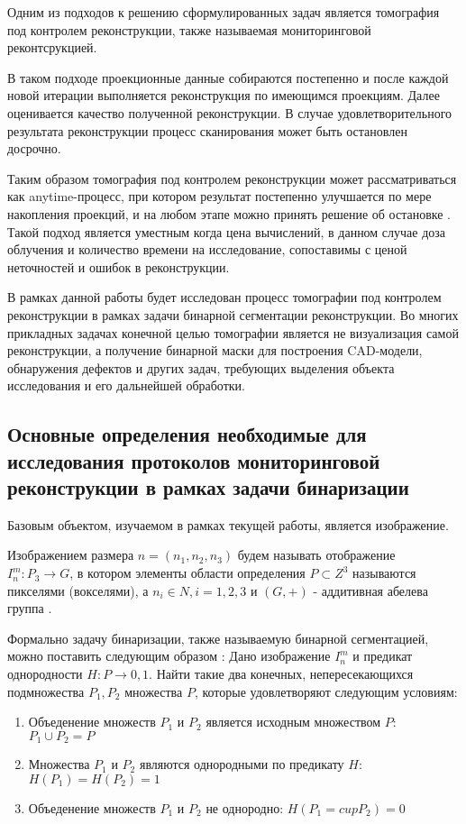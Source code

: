 Одним из подходов к решению сформулированных задач является томография под контролем реконструкции, также называемая мониторинговой реконтсрукцией. 

В таком подходе проекционные данные собираются постепенно и после каждой новой итерации выполняется реконструкция по имеющимся проекциям. Далее оценивается качество полученной реконструкции. В случае удовлетворительного результата реконструкции процесс сканирования может быть остановлен досрочно. 

Таким образом томография под контролем реконструкции может рассматриваться как anytime-процесс, при котором результат постепенно улучшается по мере накопления проекций, и на любом этапе можно принять решение об остановке \cite{bulatov2020monitored}. Такой подход является уместным когда цена вычислений, в данном случае доза облучения и количество времени на исследование, сопоставимы с ценой неточностей и ошибок в реконструкции.

В рамках данной работы будет исследован процесс томографии под контролем реконструкции в рамках задачи бинарной сегментации реконструкции. Во многих прикладных задачах конечной целью томографии является не визуализация самой реконструкции, а получение бинарной маски для построения CAD-модели, обнаружения дефектов и других задач, требующих выделения объекта исследования и его дальнейшей обработки.

\subsection{Основные определения необходимые для исследования протоколов мониторинговой реконструкции в рамках задачи бинаризации}

Базовым объектом, изучаемом в рамках текущей работы, является изображение.

Изображением размера \(n=(n_1, n_2, n_3)\) будем называть отображение \(I_n^m : P_3 \rightarrow G\), в котором элементы области определения \(P \subset Z^3\)  называются пикселями (вокселями), а \(n_i \in N, i = 1, 2, 3\) и \((G, +)\) - аддитивная абелева группа \cite{NikolaevPhdthesis}.

Формально задачу бинаризации, также называемую бинарной сегментацией, можно поставить следующим образом \cite{fu1981survey}:
Дано изображение \( I_n^m \) и предикат однородности \(H : P \rightarrow {0, 1}\). Найти такие два конечных, непересекающихся подмножества \( P_1, P_2\) множества \(P\), которые удовлетворяют следующим условиям: 
\begin{enumerate}
    \item Объеденение множеств \(P_1\) и \(P_2\) является исходным множеством \(P\): \( P_1 \cup  P_2 = P \) 
    \item Множества \(P_1\) и \(P_2\) являются однородными по предикату \(H\): \(H(P_1) = H(P_2) = 1\)
    \item Объеденение множеств \(P_1\) и \(P_2\) не однородно: \(H(P_1 =cup P_2) = 0\)
\end{enumerate}

